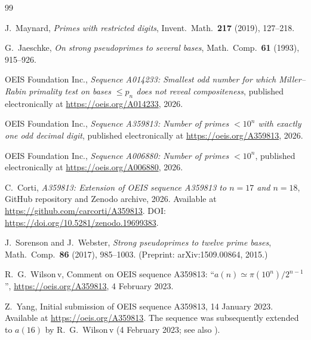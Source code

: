 \documentclass[11pt,a4paper]{article}
\theoremstyle{definition}
\begin{document}
\begin{thebibliography}{99}

J.\ Maynard,
\emph{Primes with restricted digits},
Invent.\ Math.\ \textbf{217} (2019), 127--218.

G.\ Jaeschke,
\emph{On strong pseudoprimes to several bases},
Math.\ Comp.\ \textbf{61} (1993), 915--926.

OEIS Foundation Inc.,
\emph{Sequence A014233: Smallest odd number for which Miller--Rabin
primality test on bases $\leq p_n$ does not reveal compositeness},
published electronically at \url{https://oeis.org/A014233}, 2026.

OEIS Foundation Inc.,
\emph{Sequence A359813: Number of primes $< 10^n$ with exactly one odd
decimal digit},
published electronically at \url{https://oeis.org/A359813}, 2026.

OEIS Foundation Inc.,
\emph{Sequence A006880: Number of primes $< 10^n$},
published electronically at \url{https://oeis.org/A006880}, 2026.

C.\ Corti,
\emph{A359813: Extension of OEIS sequence A359813 to $n = 17$ and
$n = 18$},
GitHub repository and Zenodo archive, 2026.
Available at \url{https://github.com/carcorti/A359813}.
DOI: \url{https://doi.org/10.5281/zenodo.19699383}.

J.\ Sorenson and J.\ Webster,
\emph{Strong pseudoprimes to twelve prime bases},
Math.\ Comp.\ \textbf{86} (2017), 985--1003.
(Preprint: arXiv:1509.00864, 2015.)

R.\ G.\ Wilson\,v,
Comment on OEIS sequence A359813: ``$a(n) \simeq \pi(10^n)/2^{n-1}$'',
\url{https://oeis.org/A359813}, 4 February 2023.

Z.\ Yang,
Initial submission of OEIS sequence A359813,
14 January 2023. Available at \url{https://oeis.org/A359813}.
The sequence was subsequently extended to $a(16)$ by R.\ G.\ Wilson\,v
(4 February 2023; see also \cite{Wilson-comment}).

\end{thebibliography}
\end{document}
